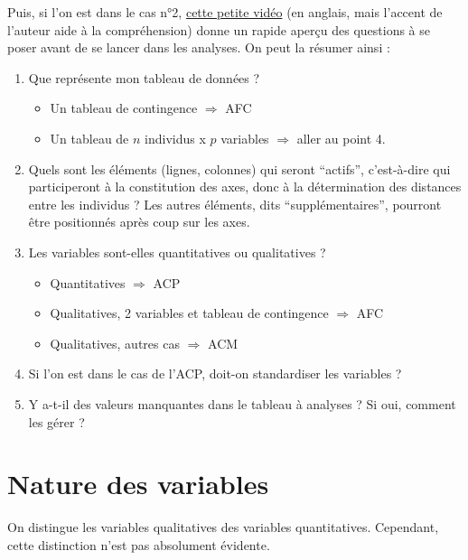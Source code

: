 \documentclass[]{book}
\providecommand{\tightlist}{%
  \setlength{\itemsep}{0pt}\setlength{\parskip}{0pt}}
\begin{document}
Puis, si l'on est dans le cas n°2, \href{https://youtu.be/aiqGyLGrQ48}{cette petite vidéo} (en anglais, mais l'accent de l'auteur aide à la compréhension) donne un rapide aperçu des questions à se poser avant de se lancer dans les analyses. On peut la résumer ainsi :

\begin{enumerate}
\def\labelenumi{\arabic{enumi}.}
\setcounter{enumi}{2}
\item
  Que représente mon tableau de données ?

  \begin{itemize}
  \tightlist
  \item
    Un tableau de contingence \(\Rightarrow\) AFC
  \item
    Un tableau de \(n\) individus x \(p\) variables \(\Rightarrow\) aller au point 4.
  \end{itemize}
\item
  Quels sont les éléments (lignes, colonnes) qui seront ``actifs'', c'est-à-dire qui participeront à la constitution des axes, donc à la détermination des distances entre les individus ? Les autres éléments, dits ``supplémentaires'', pourront être positionnés après coup sur les axes.
\item
  Les variables sont-elles quantitatives ou qualitatives ?

  \begin{itemize}
  \tightlist
  \item
    Quantitatives \(\Rightarrow\) ACP
  \item
    Qualitatives, 2 variables et tableau de contingence \(\Rightarrow\) AFC
  \item
    Qualitatives, autres cas \(\Rightarrow\) ACM
  \end{itemize}
\item
  Si l'on est dans le cas de l'ACP, doit-on standardiser les variables ?
\item
  Y a-t-il des valeurs manquantes dans le tableau à analyses ? Si oui, comment les gérer ?
\end{enumerate}

\hypertarget{nature-des-variables}{%
\section{Nature des variables}\label{nature-des-variables}}

On distingue les variables qualitatives des variables quantitatives. Cependant, cette distinction n'est pas absolument évidente.
\end{document}

